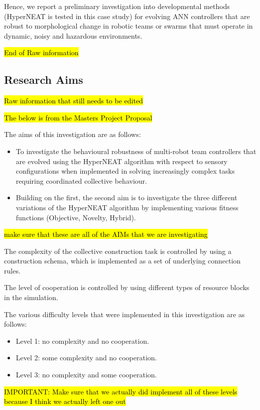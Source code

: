 \documentclass[conference]{IEEEtran}
\begin{document}
Hence, we report a preliminary investigation into developmental methods (HyperNEAT is tested in this case
study) for evolving ANN controllers that are robust to morphological change in robotic teams or swarms that
must operate in dynamic, noisy and hazardous environments.

\hl{End of Raw information}

\subsection{Research Aims}

\hl{Raw information that still needs to be edited}

\hl{The below is from the Masters Project Proposal}

The aims of this investigation are as follows:
\begin{itemize}
	\item To investigate the behavioural robustness of multi-robot team controllers that are evolved using the HyperNEAT algorithm with respect to sensory configurations when implemented in solving increasingly complex tasks requiring coordinated collective behaviour.
	\item Building on the first, the second aim is to investigate the three different variations of the HyperNEAT algorithm by implementing various fitness functions (Objective, Novelty, Hybrid).
\end{itemize}
\hl{make sure that these are all of the AIMs that we are investigating}

The complexity of the collective construction task is controlled by using a construction schema, which is implemented as a set of underlying connection rules.

The level of cooperation is controlled by using different types of resource blocks in the simulation.

The various difficulty levels that were implemented in this investigation are as follows:
\begin{itemize}
	\item Level 1: no complexity and no cooperation.
	\item Level 2: some complexity and no cooperation.
	\item Level 3: no complexity and some cooperation.
\end{itemize}

\hl{IMPORTANT: Make sure that we actually did implement all of these levels because I think we actually left one out}
\end{document}
